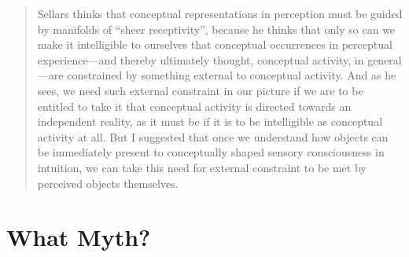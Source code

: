 \documentclass[12pt]{article}
\begin{document}
\begin{quote}
	Sellars thinks that conceptual representations in perception must be guided by manifolds of ``sheer receptivity'', because he thinks that only so can we make it intelligible to ourselves that conceptual occurrences in perceptual experience---and thereby ultimately thought, conceptual activity, in general---are constrained by something external to conceptual activity. And as he sees, we need such external constraint in our picture if we are to be entitled to take it that conceptual activity is directed towards an independent reality, as it must be if it is to be intelligible as conceptual activity at all. But I suggested that once we understand how objects can be immediately present to conceptually shaped sensory consciousness in intuition, we can take this need for external constraint to be met by perceived objects themselves. \citep[46]{McDowell:1998vn}
\end{quote}



\section{What Myth?} %
\label{sec:what_myth_}


 
 
\end{document}
